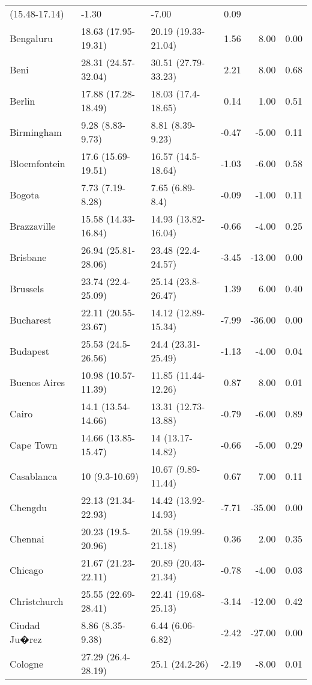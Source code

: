 \begin{longtable}{lllrrr}
 (15.48-17.14) & -1.30 & -7.00 & 0.09 \\ 
  Bengaluru & 18.63
 (17.95-19.31) & 20.19
 (19.33-21.04) & 1.56 & 8.00 & 0.00 \\ 
  Beni & 28.31
 (24.57-32.04) & 30.51
 (27.79-33.23) & 2.21 & 8.00 & 0.68 \\ 
  Berlin & 17.88
 (17.28-18.49) & 18.03
 (17.4-18.65) & 0.14 & 1.00 & 0.51 \\ 
  Birmingham & 9.28
 (8.83-9.73) & 8.81
 (8.39-9.23) & -0.47 & -5.00 & 0.11 \\ 
  Bloemfontein & 17.6
 (15.69-19.51) & 16.57
 (14.5-18.64) & -1.03 & -6.00 & 0.58 \\ 
  Bogota & 7.73
 (7.19-8.28) & 7.65
 (6.89-8.4) & -0.09 & -1.00 & 0.11 \\ 
  Brazzaville & 15.58
 (14.33-16.84) & 14.93
 (13.82-16.04) & -0.66 & -4.00 & 0.25 \\ 
  Brisbane & 26.94
 (25.81-28.06) & 23.48
 (22.4-24.57) & -3.45 & -13.00 & 0.00 \\ 
  Brussels & 23.74
 (22.4-25.09) & 25.14
 (23.8-26.47) & 1.39 & 6.00 & 0.40 \\ 
  Bucharest & 22.11
 (20.55-23.67) & 14.12
 (12.89-15.34) & -7.99 & -36.00 & 0.00 \\ 
  Budapest & 25.53
 (24.5-26.56) & 24.4
 (23.31-25.49) & -1.13 & -4.00 & 0.04 \\ 
  Buenos Aires & 10.98
 (10.57-11.39) & 11.85
 (11.44-12.26) & 0.87 & 8.00 & 0.01 \\ 
  Cairo & 14.1
 (13.54-14.66) & 13.31
 (12.73-13.88) & -0.79 & -6.00 & 0.89 \\ 
  Cape Town & 14.66
 (13.85-15.47) & 14
 (13.17-14.82) & -0.66 & -5.00 & 0.29 \\ 
  Casablanca & 10
 (9.3-10.69) & 10.67
 (9.89-11.44) & 0.67 & 7.00 & 0.11 \\ 
  Chengdu & 22.13
 (21.34-22.93) & 14.42
 (13.92-14.93) & -7.71 & -35.00 & 0.00 \\ 
  Chennai & 20.23
 (19.5-20.96) & 20.58
 (19.99-21.18) & 0.36 & 2.00 & 0.35 \\ 
  Chicago & 21.67
 (21.23-22.11) & 20.89
 (20.43-21.34) & -0.78 & -4.00 & 0.03 \\ 
  Christchurch & 25.55
 (22.69-28.41) & 22.41
 (19.68-25.13) & -3.14 & -12.00 & 0.42 \\ 
  Ciudad Ju�rez & 8.86
 (8.35-9.38) & 6.44
 (6.06-6.82) & -2.42 & -27.00 & 0.00 \\ 
  Cologne & 27.29
 (26.4-28.19) & 25.1
 (24.2-26) & -2.19 & -8.00 & 0.01 \\ 

\end{longtable}
